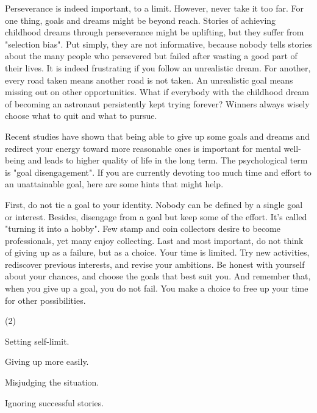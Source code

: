 \documentclass{英语试卷}
\begin{document}
\par Perseverance is indeed important, to a limit. However, never take it too far. For one thing, goals and dreams might be beyond reach. Stories of achieving childhood dreams through perseverance might be uplifting, but they suffer from "selection bias". Put simply, they are not informative, because nobody tells stories about the many people who persevered but failed after wasting a good part of their lives. It is indeed frustrating if you follow an unrealistic dream. For another, every road taken means another road is not taken. An unrealistic goal means missing out on other opportunities. What if everybody with the childhood dream of becoming an astronaut persistently kept trying forever? Winners always wisely choose what to quit and what to pursue.\par
\par Recent studies have shown that being able to give up some goals and dreams and redirect your energy toward more reasonable ones is important for mental well-being and leads to higher quality of life in the long term. The psychological term is "goal disengagement". If you are currently devoting too much time and effort to an unattainable goal, here are some hints that might help.\par
\par First, do not tie a goal to your identity. Nobody can be defined by a single goal or interest. Besides, disengage from a goal but keep some of the effort. It's called "turning it into a hobby". Few stamp and coin collectors desire to become professionals, yet many enjoy collecting. Last and most important, do not think of giving up as a failure, but as a choice. Your time is limited. Try new activities, rediscover previous interests, and revise your ambitions. Be honest with yourself about your chances, and choose the goals that best suit you. And remember that, when you give up a goal, you do not fail. You make a choice to free up your time for other possibilities.\par
{}
\begin{choices}(2)
  \item Setting self-limit.
  \item Giving up more easily.
  \item Misjudging the situation.
  \item Ignoring successful stories.
\end{choices}
\end{document}
